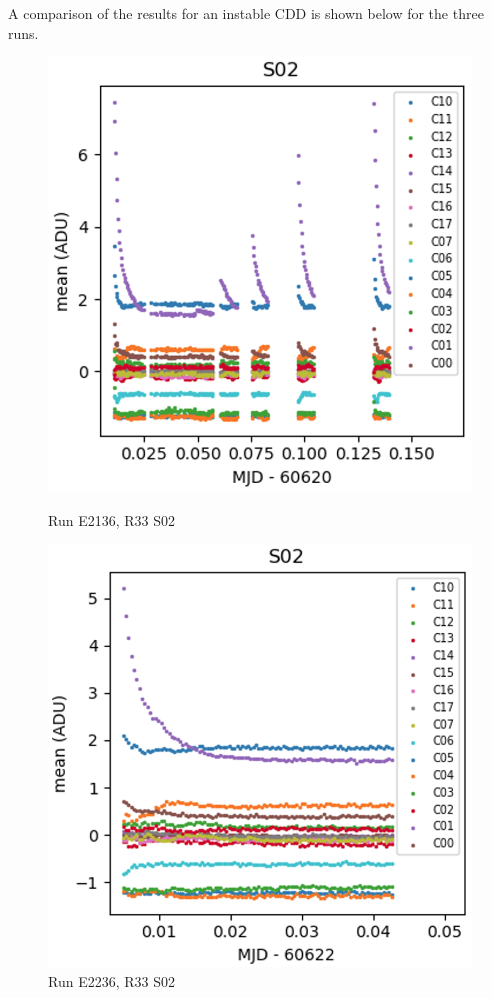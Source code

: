 A comparison of the results for an instable CDD is shown below for the
three runs.

\begin{figure}[htbp]
\centering
\begin{minipage}[b]{0.45\textwidth}
    \centering
    \includegraphics[width=\textwidth]{sections/figures/E2136_R33_S02.png}
    \caption{Run E2136, R33 S02}
\end{minipage}
\hspace{0.05\textwidth}
\begin{minipage}[b]{0.45\textwidth}
    \centering
    \includegraphics[width=\textwidth]{sections/figures/E2236_R33_S02.png}
    \caption{Run E2236, R33 S02}
\end{minipage}


\end{figure}
